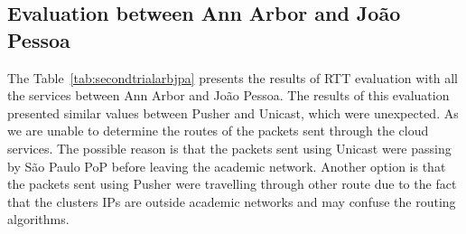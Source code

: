 \subsection*{Evaluation between Ann Arbor and João Pessoa} 

The Table~\ref{tab:secondtrialarbjpa} presents the results of RTT evaluation with all the services between Ann Arbor and João Pessoa.
The results of this evaluation presented similar values between Pusher and Unicast, which were unexpected.
As we are unable to determine the routes of the packets sent through the cloud services.
The possible reason is that the packets sent using Unicast were passing by São Paulo PoP before leaving the academic network.
Another option is that the packets sent using Pusher were travelling through other route due to the fact that the clusters IPs are outside academic networks and may confuse the routing algorithms.

